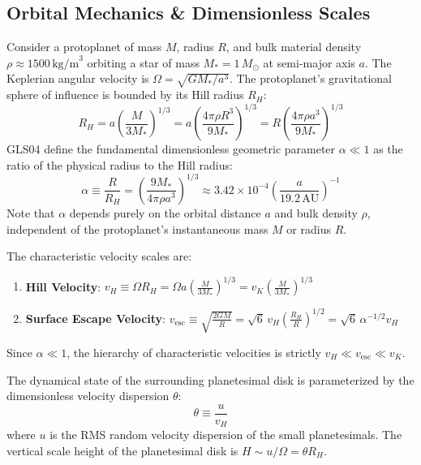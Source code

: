 \documentclass[11pt,a4paper]{article}
\begin{document}
\subsection{Orbital Mechanics \& Dimensionless Scales}
Consider a protoplanet of mass $M$, radius $R$, and bulk material density $\rho \approx 1500\,\text{kg/m}^3$ orbiting a star of mass $M_* = 1\,M_\odot$ at semi-major axis $a$. The Keplerian angular velocity is $\Omega = \sqrt{G M_* / a^3}$. The protoplanet's gravitational sphere of influence is bounded by its Hill radius $R_H$:
\begin{equation}
R_H = a \left(\frac{M}{3 M_*}\right)^{1/3} = a \left(\frac{4\pi \rho R^3}{9 M_*}\right)^{1/3} = R \left(\frac{4\pi \rho a^3}{9 M_*}\right)^{1/3}
\label{eq:hill_radius}
\end{equation}
GLS04 define the fundamental dimensionless geometric parameter $\alpha \ll 1$ as the ratio of the physical radius to the Hill radius:
\begin{equation}
\alpha \equiv \frac{R}{R_H} = \left(\frac{9 M_*}{4\pi \rho a^3}\right)^{1/3} \approx 3.42 \times 10^{-4} \left(\frac{a}{19.2\,\text{AU}}\right)^{-1}
\label{eq:alpha}
\end{equation}
Note that $\alpha$ depends purely on the orbital distance $a$ and bulk density $\rho$, independent of the protoplanet's instantaneous mass $M$ or radius $R$.

The characteristic velocity scales are:
\begin{enumerate}
    \item \textbf{Hill Velocity}: $v_H \equiv \Omega R_H = \Omega a \left(\frac{M}{3 M_*}\right)^{1/3} = v_K \left(\frac{M}{3 M_*}\right)^{1/3}$
    \item \textbf{Surface Escape Velocity}: $v_{\text{esc}} \equiv \sqrt{\frac{2 G M}{R}} = \sqrt{6} \, v_H \left(\frac{R_H}{R}\right)^{1/2} = \sqrt{6} \, \alpha^{-1/2} v_H$
\end{enumerate}
Since $\alpha \ll 1$, the hierarchy of characteristic velocities is strictly $v_H \ll v_{\text{esc}} \ll v_K$.

The dynamical state of the surrounding planetesimal disk is parameterized by the dimensionless velocity dispersion $\theta$:
\begin{equation}
\theta \equiv \frac{u}{v_H}
\label{eq:theta}
\end{equation}
where $u$ is the RMS random velocity dispersion of the small planetesimals. The vertical scale height of the planetesimal disk is $H \sim u / \Omega = \theta R_H$.
\end{document}
